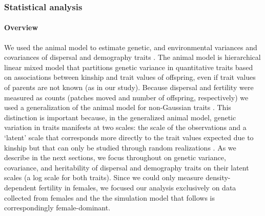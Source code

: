 \documentclass[11pt]{article}
\newcommand{\revise}[1]{{\color{Mahogany}{#1}}}
\begin{document}
\subsubsection*{Statistical analysis}
\paragraph{Overview}
We used the animal model to estimate genetic, \revise{maternal,} and environmental variances and covariances of dispersal and demography traits \citep{lynch_genetics_1998,kruuk_estimating_2004,wilson_ecologists_2010}.
The animal model is hierarchical linear mixed model that partitions genetic variance in quantitative traits based on associations between kinship and trait values of offspring, even if trait values of parents are not known (as in our study).
Because dispersal and fertility were measured as counts (patches moved and number of offspring, respectively) we used a generalization of the animal model for non-Gaussian traits \citep{de2016general}.
This distinction is important because, in the generalized animal model, genetic variation in traits manifests at two scales: the scale of the observations and a `latent' scale that corresponds more directly to the trait values expected due to kinship but that can only be studied through random realizations \citep{de2016general}.
As we describe in the next sections, we focus throughout on genetic variance, covariance, and heritability of dispersal and demography traits on their latent scales (a log scale for both traits).
Since we could only measure density-dependent fertility in females, we focused our analysis exclusively on data collected from females and the the simulation model that follows is correspondingly female-dominant.

\end{document}
